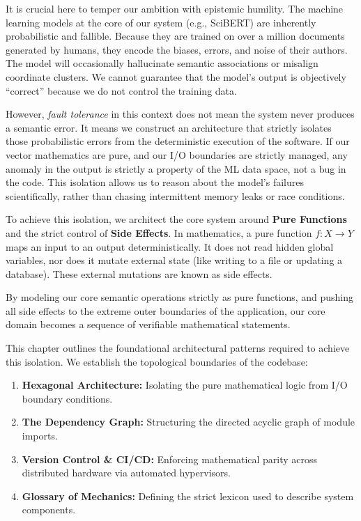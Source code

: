 It is crucial here to temper our ambition with epistemic humility. The machine learning models at the core of our system (e.g., SciBERT) are inherently probabilistic and fallible. Because they are trained on over a million documents generated by humans, they encode the biases, errors, and noise of their authors. The model will occasionally hallucinate semantic associations or misalign coordinate clusters. We cannot guarantee that the model's output is objectively ``correct'' because we do not control the training data.

However, \textit{fault tolerance} in this context does not mean the system never produces a semantic error. It means we construct an architecture that strictly isolates those probabilistic errors from the deterministic execution of the software. If our vector mathematics are pure, and our I/O boundaries are strictly managed, any anomaly in the output is strictly a property of the ML data space, not a bug in the code. This isolation allows us to reason about the model's failures scientifically, rather than chasing intermittent memory leaks or race conditions.

To achieve this isolation, we architect the core system around \textbf{Pure Functions} and the strict control of \textbf{Side Effects}. In mathematics, a pure function $f: X \to Y$ maps an input to an output deterministically. It does not read hidden global variables, nor does it mutate external state (like writing to a file or updating a database). These external mutations are known as side effects.

By modeling our core semantic operations strictly as pure functions, and pushing all side effects to the extreme outer boundaries of the application, our core domain becomes a sequence of verifiable mathematical statements.










This chapter outlines the foundational architectural patterns required to achieve this isolation. We establish the topological boundaries of the codebase:
\begin{enumerate}
    \item \textbf{Hexagonal Architecture:} Isolating the pure mathematical logic from I/O boundary conditions.
    \item \textbf{The Dependency Graph:} Structuring the directed acyclic graph of module imports.
    \item \textbf{Version Control \& CI/CD:} Enforcing mathematical parity across distributed hardware via automated hypervisors.
    \item \textbf{Glossary of Mechanics:} Defining the strict lexicon used to describe system components.
\end{enumerate}


